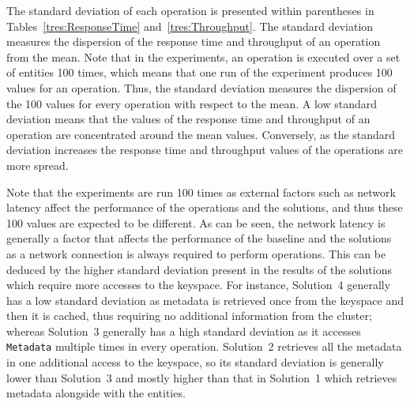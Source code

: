 
The standard deviation of each operation is presented within parentheses in
Tables~\ref{tres:ResponseTime} and~\ref{tres:Throughput}. The standard deviation
measures the dispersion of the response time and throughput of an operation from
the mean. Note that in the experiments, an operation is executed over a set of
entities  100 times, which means that one run of the experiment produces 100
values for an operation. Thus, the standard deviation measures the dispersion of
the 100 values for every operation with respect to the mean. A low standard
deviation means that the values of the response time and throughput of an
operation are concentrated around the mean values. Conversely, as the standard
deviation increases  the response time and throughput values of the operations
are more spread. 

Note that the experiments are run  100 times  as external factors such as
network latency affect the performance of the operations and the solutions, and
thus these 100 values are expected to be different. As can be seen, the network
latency is generally a factor that affects the performance of the baseline and
the solutions  as a network connection is always required to perform operations.
This can be deduced by the higher standard deviation present in the results of
the  solutions  which require more accesses to the keyspace. For instance,
Solution~4 generally has a low standard deviation as
 metadata is retrieved once from the keyspace and then it is cached, thus
 requiring no additional information from the cluster; whereas Solution~3
generally has a high standard deviation as it   accesses \texttt{Metadata}
multiple times in every operation. Solution~2 retrieves all the metadata in one
additional access to the keyspace, so its standard deviation is generally lower
than Solution~3 and mostly higher than that in Solution~1 which retrieves
metadata alongside with the entities.

% 

